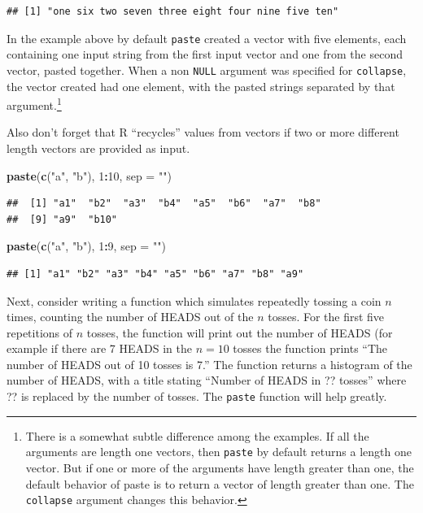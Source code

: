 \documentclass[
]{krantz}
\newenvironment{Shaded}{\begin{snugshade}}{\end{snugshade}}
\newcommand{\DataTypeTok}[1]{\textcolor[rgb]{0.13,0.29,0.53}{#1}}
\newcommand{\DecValTok}[1]{\textcolor[rgb]{0.00,0.00,0.81}{#1}}
\newcommand{\KeywordTok}[1]{\textcolor[rgb]{0.13,0.29,0.53}{\textbf{#1}}}
\newcommand{\NormalTok}[1]{#1}
\newcommand{\OperatorTok}[1]{\textcolor[rgb]{0.81,0.36,0.00}{\textbf{#1}}}
\newcommand{\StringTok}[1]{\textcolor[rgb]{0.31,0.60,0.02}{#1}}
\begin{document}
\begin{verbatim}
## [1] "one six two seven three eight four nine five ten"
\end{verbatim}

In the example above by default \texttt{paste} created a vector with five elements, each containing one input string from the first input vector and one from the second vector, pasted together. When a non \texttt{NULL} argument was specified for \texttt{collapse}, the vector created had one element, with the pasted strings separated by that argument.\footnote{There is a somewhat subtle difference among the examples. If all the arguments are length one vectors, then \texttt{paste} by default returns a length one vector. But if one or more of the arguments have length greater than one, the default behavior of paste is to return a vector of length greater than one. The \texttt{collapse} argument changes this behavior.}

Also don't forget that R ``recycles'' values from vectors if two or more different length vectors are provided as input.

\begin{Shaded}
\begin{Highlighting}[]
\KeywordTok{paste}\NormalTok{(}\KeywordTok{c}\NormalTok{(}\StringTok{"a"}\NormalTok{, }\StringTok{"b"}\NormalTok{), }\DecValTok{1}\OperatorTok{:}\DecValTok{10}\NormalTok{, }\DataTypeTok{sep =} \StringTok{""}\NormalTok{)}
\end{Highlighting}
\end{Shaded}

\begin{verbatim}
##  [1] "a1"  "b2"  "a3"  "b4"  "a5"  "b6"  "a7"  "b8" 
##  [9] "a9"  "b10"
\end{verbatim}

\begin{Shaded}
\begin{Highlighting}[]
\KeywordTok{paste}\NormalTok{(}\KeywordTok{c}\NormalTok{(}\StringTok{"a"}\NormalTok{, }\StringTok{"b"}\NormalTok{), }\DecValTok{1}\OperatorTok{:}\DecValTok{9}\NormalTok{, }\DataTypeTok{sep =} \StringTok{""}\NormalTok{)}
\end{Highlighting}
\end{Shaded}

\begin{verbatim}
## [1] "a1" "b2" "a3" "b4" "a5" "b6" "a7" "b8" "a9"
\end{verbatim}

Next, consider writing a function which simulates repeatedly tossing a coin \(n\) times, counting the number of HEADS out of the \(n\) tosses. For the first five repetitions of \(n\) tosses, the function will print out the number of HEADS (for example if there are 7 HEADS in the \(n=10\) tosses the function prints ``The number of HEADS out of 10 tosses is 7.'' The function returns a histogram of the number of HEADS, with a title stating ``Number of HEADS in ?? tosses'' where ?? is replaced by the number of tosses. The \texttt{paste} function will help greatly.
\end{document}
